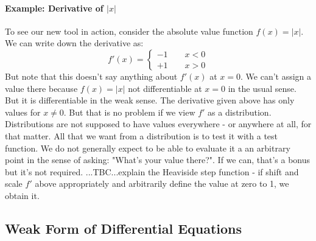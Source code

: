 



\paragraph{Example: Derivative of $|x|$}
To see our new tool in action, consider the absolute value function $f(x) = |x|$. We can write down the derivative as:
\begin{equation}
f'(x) = 
 \begin{cases}
 -1 \qquad  x < 0 \\
 +1 \qquad  x > 0
 \end{cases}
\end{equation}
But note that this doesn't say anything about $f'(x)$ at $x = 0$. We can't assign a value there because $f(x) = |x|$ not differentiable at $x = 0$ in the usual sense. But it is differentiable in the weak sense. The derivative given above has only values for $x \neq 0$. But that is no problem if we view $f'$ as a distribution. Distributions are not supposed to have values everywhere - or anywhere at all, for that matter. All that we want from a distribution is to test it with a test function. We do not generally expect to be able to evaluate it a an arbitrary point in the sense of asking: "What's your value there?". If we can, that's a bonus but it's not required. ...TBC...explain the Heaviside step function - if shift and scale $f'$ above appropriately and arbitrarily define the value at zero to 1, we obtain it.


\subsection{Weak Form of Differential Equations}

